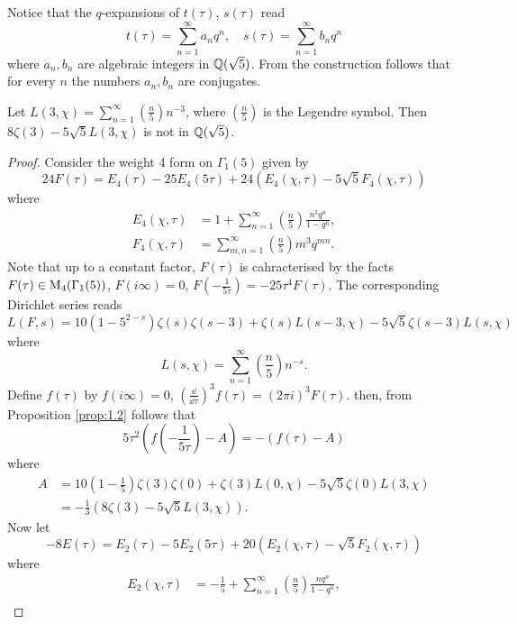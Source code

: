 Notice that the $q$-expansions of $t(\tau)$, $s(\tau)$ read
$$
    t(\tau) = \sum_{n=1}^{\infty} a_n q^n, \quad s(\tau) = \sum_{n=1}^{\infty} b_n q^n
$$
where $a_n, b_n$ are algebraic integers in $\mathbb{Q}(\sqrt{5})$.
From the construction follows that for every $n$ the numbers $a_n, b_n$ are conjugates.

\begin{theorem}
    \label{thm:4}
    Let $L(3, \chi) = \sum_{n=1}^{\infty} \left(\frac{n}{5}\right) n^{-3}$, where $\left(\frac{n}{5}\right)$ is the Legendre symbol.
    Then $8\zeta(3) - 5\sqrt{5}L(3, \chi)$ is not in $\mathbb{Q}(\sqrt{5})$.
\end{theorem}

\begin{proof}
    Consider the weight 4 form on $\Gamma_1(5)$ given by
    $$
        24 F(\tau) = E_4(\tau) - 25 E_4(5\tau) + 24(E_4(\chi, \tau) - 5\sqrt{5} F_4(\chi, \tau))
    $$
    where
    \begin{align*}
        E_4(\chi, \tau) &= 1 + \sum_{n=1}^{\infty} \left(\frac{n}{5}\right) \frac{n^3 q^n}{1 - q^n}, \\
        F_4(\chi, \tau) &= \sum_{m, n=1}^{\infty} \left(\frac{n}{5}\right) m^3  q^{mn}.
    \end{align*}
    Note that up to a constant factor, $F(\tau)$ is cahracterised by the facts $F(\tau) \in \mathrm{M}_4(\Gamma_1(5))$, $F(i\infty) = 0$, $F(-\frac{1}{5\tau}) = -25 \tau^4 F(\tau)$.
    The corresponding Dirichlet series reads
    $$
        L(F, s) = 10 (1 - 5^{2-s})\zeta(s) \zeta(s - 3) + \zeta(s) L(s - 3, \chi) - 5\sqrt{5} \zeta(s - 3) L(s, \chi)
    $$
    where
    $$
        L(s, \chi) = \sum_{n=1}^{\infty} \left(\frac{n}{5}\right) n^{-s}.
    $$
    Define $f(\tau)$ by $f(i\infty) = 0$, $(\frac{\dd}{\dd \tau})^{3} f(\tau) = (2\pi i)^3 F(\tau)$.
    then, from Proposition \ref{prop:1.2} follows that
    $$
        5 \tau^2 \left(f\left(-\frac{1}{5\tau}\right) - A\right) = - (f(\tau) - A)
    $$
    where
    \begin{align*}
        A &= 10\left(1 - \frac{1}{5}\right) \zeta(3) \zeta(0) + \zeta(3) L(0, \chi) - 5\sqrt{5} \zeta(0) L(3, \chi) \\
        &= -\frac{1}{3} (8\zeta(3) - 5\sqrt{5} L(3, \chi)).
    \end{align*}
    Now let 
    $$
        -8 E(\tau) = E_2(\tau) - 5 E_2(5\tau) + 20 (E_2(\chi, \tau) - \sqrt{5} F_2(\chi, \tau))
    $$
    where
    \begin{align*}
        E_2(\chi, \tau) &= -\frac{1}{5} + \sum_{n=1}^{\infty} \left(\frac{n}{5}\right) \frac{n q^n}{1 - q^n}, \\

\end{align*}
\end{proof}
